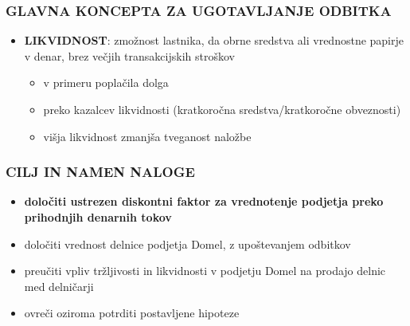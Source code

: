 \documentclass{beamer}
\begin{document}
\begin{frame}
\frametitle{GLAVNA KONCEPTA ZA UGOTAVLJANJE ODBITKA}
\begin{itemize}
\item \textbf{LIKVIDNOST}: zmožnost lastnika, da obrne sredstva ali vrednostne papirje v denar, brez večjih transakcijskih stroškov
\begin{itemize}
\item v primeru poplačila dolga
\item preko kazalcev likvidnosti (kratkoročna sredstva/kratkoročne obveznosti)
\item višja likvidnost zmanjša tveganost naložbe
\end{itemize}
\end{itemize}
\end{frame}




\begin{frame}
\frametitle{CILJ IN NAMEN NALOGE}
\begin{itemize}
\item \textbf{določiti ustrezen diskontni faktor za vrednotenje podjetja preko prihodnjih denarnih tokov}
\item določiti vrednost delnice podjetja Domel, z upoštevanjem odbitkov
\item preučiti vpliv tržljivosti in likvidnosti v podjetju Domel na prodajo delnic med delničarji
\item ovreči oziroma potrditi postavljene hipoteze
\end{itemize}
\end{frame}
\end{document}
